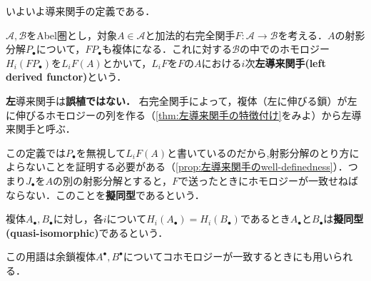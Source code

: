いよいよ導来関手の定義である．
\begin{defi}[左導来関手]
	$\mathscr{A}, \mathscr{B}$をAbel圏とし，対象$A\in\mathscr{A}$と加法的右完全関手$F:\mathscr{A}\to\mathscr{B}$を考える．$A$の射影分解$P_\bullet$について，$F P_\bullet$も複体になる．これに対する$\mathscr{B}$の中でのホモロジー$H_i(F P_\bullet)$を$L_i F (A)$とかいて，$L_iF$を$F$の$A$における$i$次\textbf{左導来関手(left derived functor)}という．
\end{defi}

\textbf{左}導来関手は\textbf{誤植ではない．} 右完全関手によって，複体（左に伸びる鎖）が左に伸びるホモロジーの列を作る（\ref{thm:左導来関手の特徴付け}をみよ）から左導来関手と呼ぶ．

この定義では$P_\bullet$を無視して$L_i F(A)$と書いているのだから,射影分解のとり方によらないことを証明する必要がある（\ref{prop:左導来関手のwell-definedness}）．つまり$J_\bullet$を$A$の別の射影分解とすると，$F$で送ったときにホモロジーが一致せねばならない．このことを\textbf{擬同型}であるという．

\begin{defi}[擬同型]
	複体$A_\bullet,B_\bullet$に対し，各$i$について$H_i(A_\bullet)=H_i(B_\bullet)$であるとき$A_\bullet$と$B_\bullet$は\textbf{擬同型(quasi-isomorphic)}であるという．
\end{defi}

この用語は余鎖複体$A^\bullet,B^\bullet$についてコホモロジーが一致するときにも用いられる．

